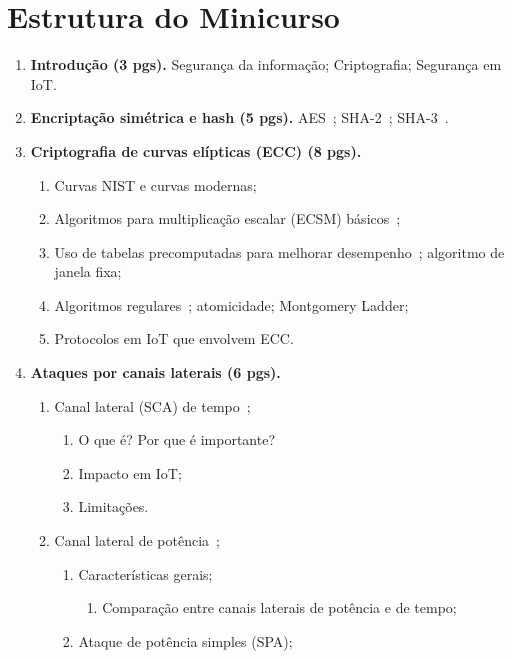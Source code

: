 \documentclass[12pt]{article}
\begin{document}
\section{Estrutura do Minicurso}
\begin{enumerate}
\item \textbf{Introdução (3 pgs).} Seguran\c{c}a da informa\c{c}\~ao; Criptografia; Seguran\c{c}a em IoT.
\item \textbf {Encripta\c{c}\~ao sim\'etrica e hash (5 pgs).} AES~\cite{AES}; SHA-2~\cite{SHA2}; SHA-3~\cite{SHA3}.
\item \textbf{Criptografia de curvas el\'ipticas (ECC) (8 pgs).} 
    \begin{enumerate}
        \item Curvas NIST e curvas modernas;
        \item Algoritmos para multiplica\c{c}\~ao escalar (ECSM) b\'asicos~\cite{ECCBook_HankersonVanstone2004};
        \item Uso de tabelas precomputadas para melhorar desempenho~\cite{ECCBook_HankersonVanstone2004}; algoritmo de janela fixa;
        \item Algoritmos regulares~\cite{ECCBook_CohenFreyAvanzi2010}; atomicidade; Montgomery Ladder;
        \item Protocolos em IoT que envolvem ECC.
    \end{enumerate}
\item \textbf{Ataques por canais laterais (6 pgs).}
    \begin{enumerate}
        \item Canal lateral (SCA) de tempo~\cite{Kocher96};
            \begin{enumerate}
                \item O que \'e? Por que \'e importante?
                \item Impacto em IoT;
                \item Limita\c{c}\~oes.
            \end{enumerate}
        \item Canal lateral de pot\^encia~\cite{SCABook_Mangard2007};
        \begin{enumerate}
            \item Caracter\'isticas gerais;
            \begin{enumerate}
                \item Compara\c{c}\~ao entre canais laterais de pot\^encia e de tempo;
            \end{enumerate}
            \item Ataque de pot\^encia simples (SPA);

\end{enumerate}
\end{enumerate}
\end{enumerate}
\end{document}
